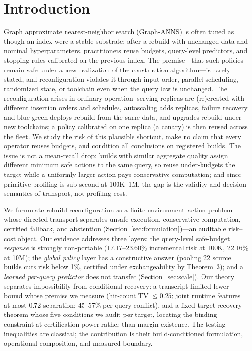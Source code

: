 \documentclass{article}
\begin{document}
\section{Introduction}
\label{sec:intro}

Graph approximate nearest-neighbor search (Graph-ANNS) is often tuned as though an index were a stable
substrate: after a rebuild with unchanged data and nominal hyperparameters, practitioners reuse budgets,
query-level predictors, and stopping rules calibrated on the previous index. The premise---that such
policies remain safe under a new realization of the construction algorithm---is rarely stated, and
reconfiguration violates it through input order, parallel scheduling, randomized state, or toolchain even
when the query law is unchanged. The reconfiguration arises in ordinary operation: serving replicas are
(re)created with different insertion orders and schedules, autoscaling adds replicas, failure recovery and
blue-green deploys rebuild from the same data, and upgrades rebuild under new toolchains; a policy
calibrated on one replica (a canary) is then reused across the fleet. We study the risk of this plausible
shortcut, make no claim that every operator reuses budgets, and condition all conclusions on registered
builds. The issue is not a mean-recall drop: builds with similar aggregate quality assign different
minimum safe actions to the same query, so reuse under-budgets the target while a uniformly larger action
pays conservative computation; and since primitive profiling is sub-second at 100K--1M, the gap is the
validity and decision semantics of transport, not profiling cost.

We formulate rebuild reconfiguration as a finite environment--action problem whose directed transport
separates unsafe execution, conservative computation, certified fallback, and abstention
(Section~\ref{sec:formulation})---an auditable risk--cost object. Our evidence addresses three layers: the
query-level safe-budget \emph{response} is strongly non-portable (17.17--23.60\% incremental risk at
100K, 22.16\% at 10M); the \emph{global policy} layer has a constructive answer (pooling 22 source builds
cuts risk below 1\%, certified under exchangeability by Theorem~3); and a \emph{learned per-query
predictor} does not transfer (Section~\ref{sec:scale}). Our theory separates impossibility from
conditional recovery: a transcript-limited lower bound whose premise we measure (hit-count TV $\le0.25$;
joint runtime features at most 0.72 separation; 45--57\% per-query conflict), and a fixed-target recovery
theorem whose five conditions we audit per target, locating the binding constraint at certification power
rather than margin existence. The testing inequalities are classical; the contribution is their
build-conditioned formulation, operational composition, and measured boundary.
\end{document}

